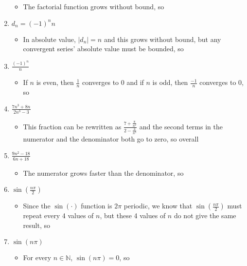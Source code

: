 \documentclass[10pt,a4paper]{article}
\theoremstyle{definition}
\begin{document}
\begin{enumerate}[label = (\alph*)]
	\begin{itemize}
	\item The factorial function grows without bound, so 
	\end{itemize}
\item $\displaystyle d_n = (-1)^nn$
	\begin{itemize}
	\item In absolute value, $|d_n| = n$ and this grows without bound, but any convergent series' absolute value must be bounded, so 
	\end{itemize}
\item $\displaystyle \frac{(-1)^n}{n}$
	\begin{itemize}
	\item If $n$ is even, then $\displaystyle \frac{1}{n}$ converges to 0 and if $n$ is odd, then $\displaystyle \frac{-1}{n}$ converges to 0, so 
	\end{itemize}
\item $\displaystyle \frac{7n^3 + 8n}{2n^3 - 3}$
	\begin{itemize}
	\item This fraction can be rewritten as $\displaystyle \frac{7 + \frac{8}{n^2}}{2 - \frac{3}{n^3}}$ and the second terms in the numerator and the denominator both go to zero, so overall 
	\end{itemize}
\item $\displaystyle \frac{9n^2 - 18}{6n + 18}$
	\begin{itemize}
	\item The numerator grows faster than the denominator, so 
	\end{itemize}
\item $\displaystyle \sin\left(\frac{n \pi}{2}\right)$
	\begin{itemize}
	\item Since the $\sin(\cdot)$ function is $2\pi$ periodic, we know that $\displaystyle \sin\left(\frac{n \pi}{2}\right)$ must repeat every 4 values of $n$, but these 4 values of $n$ do not give the same result, so 
	\end{itemize}
\item $\displaystyle \sin(n\pi)$
	\begin{itemize}
	\item For every $n \in \mathbb{N}$, $\sin(n\pi) = 0$, so 

\end{itemize}
\end{enumerate}
\end{document}
